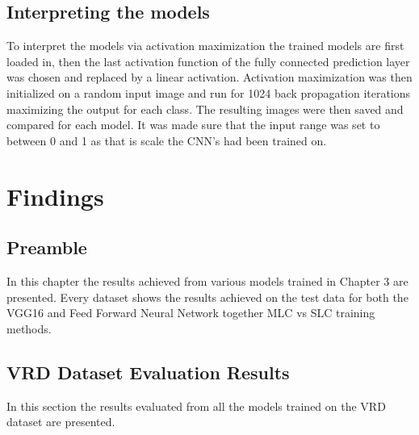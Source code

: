 \documentclass{csfyp}
\begin{document}
\subsection{Interpreting the models}
To interpret the models via activation maximization the trained models are first loaded in, then the last activation function of the fully connected prediction layer was chosen and replaced by a linear activation. Activation maximization was then initialized on a random input image and run for 1024 back propagation iterations maximizing the output for each class. The resulting images were then saved and compared for each model. It was made sure that the input range was set to between 0 and 1 as that is scale the CNN's had been trained on.

\section{Findings}
\subsection{Preamble}
In this chapter the results achieved from various models trained in Chapter 3 are presented. Every dataset shows the results achieved on the test data for both the VGG16 and Feed Forward Neural Network together MLC vs SLC training methods.

\subsection{VRD Dataset Evaluation Results}
In this section the results evaluated from all the models trained on the VRD dataset are presented.
\end{document}
